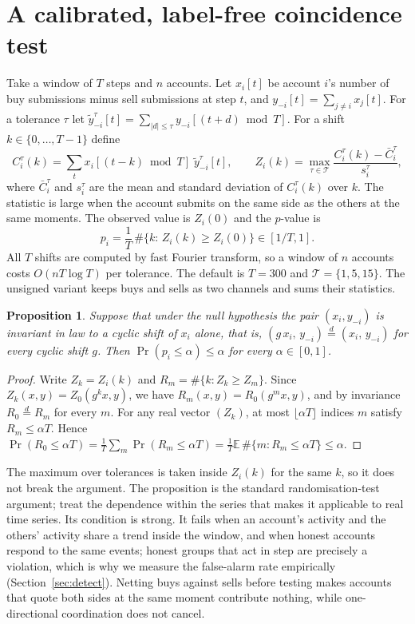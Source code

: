 \documentclass[11pt,a4paper]{article}
\newtheorem{proposition}{Proposition}
\begin{document}
\section{A calibrated, label-free coincidence test}\label{sec:method}

Take a window of $T$ steps and $n$ accounts. Let $x_i[t]$ be account $i$'s number of buy submissions minus sell submissions at step $t$, and $y_{-i}[t]=\sum_{j\ne i}x_j[t]$. For a tolerance $\tau$ let $\tilde y^{\tau}_{-i}[t]=\sum_{|d|\le\tau}y_{-i}[(t+d)\bmod T]$. For a shift $k\in\{0,\dots,T-1\}$ define
\begin{equation}
C^{\tau}_i(k)=\sum_{t}x_i[(t-k)\bmod T]\;\tilde y^{\tau}_{-i}[t],\qquad
Z_i(k)=\max_{\tau\in\mathcal T}\frac{C^{\tau}_i(k)-\bar C^{\tau}_i}{s^{\tau}_i},
\end{equation}
where $\bar C^{\tau}_i$ and $s^{\tau}_i$ are the mean and standard deviation of $C^{\tau}_i(k)$ over $k$. The statistic is large when the account submits on the same side as the others at the same moments. The observed value is $Z_i(0)$ and the $p$-value is
\begin{equation}
p_i=\frac1T\,\#\{k:\,Z_i(k)\ge Z_i(0)\}\in[1/T,1].
\end{equation}
All $T$ shifts are computed by fast Fourier transform, so a window of $n$ accounts costs $O(nT\log T)$ per tolerance. The default is $T=300$ and $\mathcal T=\{1,5,15\}$. The unsigned variant keeps buys and sells as two channels and sums their statistics.

\begin{proposition}\label{prop:exact}
Suppose that under the null hypothesis the pair $(x_i,y_{-i})$ is invariant in law to a cyclic shift of $x_i$ alone, that is, $(g\,x_i,\,y_{-i})\overset{d}{=}(x_i,\,y_{-i})$ for every cyclic shift $g$. Then $\Pr(p_i\le\alpha)\le\alpha$ for every $\alpha\in[0,1]$.
\end{proposition}
\begin{proof}
Write $Z_k=Z_i(k)$ and $R_m=\#\{k: Z_k\ge Z_m\}$. Since $Z_k(x,y)=Z_0(g^k x,y)$, we have $R_m(x,y)=R_0(g^m x,y)$, and by invariance $R_0\overset{d}{=}R_m$ for every $m$. For any real vector $(Z_k)$, at most $\lfloor\alpha T\rfloor$ indices $m$ satisfy $R_m\le\alpha T$. Hence $\Pr(R_0\le\alpha T)=\tfrac1T\sum_m\Pr(R_m\le\alpha T)=\tfrac1T\mathbb E\,\#\{m:R_m\le\alpha T\}\le\alpha$. \qedhere
\end{proof}

The maximum over tolerances is taken inside $Z_i(k)$ for the same $k$, so it does not break the argument. The proposition is the standard randomisation-test argument; \citet{liang2025} treat the dependence within the series that makes it applicable to real time series. Its condition is strong. It fails when an account's activity and the others' activity share a trend inside the window, and when honest accounts respond to the same events; honest groups that act in step are precisely a violation, which is why we measure the false-alarm rate empirically (Section~\ref{sec:detect}). Netting buys against sells before testing makes accounts that quote both sides at the same moment contribute nothing, while one-directional coordination does not cancel.
\end{document}
